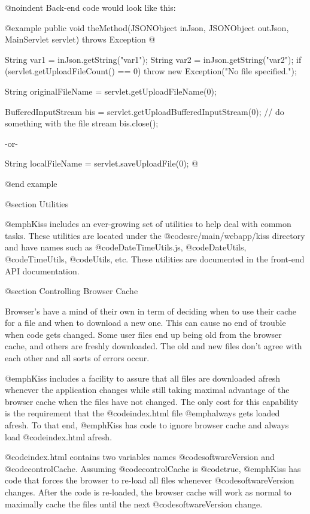 @noindent
Back-end code would look like this:

@example
public void theMethod(JSONObject inJson, JSONObject outJson, MainServlet servlet) throws Exception @{
    String var1 = inJson.getString("var1");
    String var2 = inJson.getString("var2");
    if (servlet.getUploadFileCount() == 0)
        throw new Exception("No file specified.");
        
    String originalFileName = servlet.getUploadFileName(0);
    
    
    BufferedInputStream bis = servlet.getUploadBufferedInputStream(0);
    // do something with the file stream
    bis.close();
    
         -or-
         
    String localFileName = servlet.saveUploadFile(0);
@}
@end example




@section Utilities

@emph{Kiss} includes an ever-growing set of utilities to help deal with common tasks.
These utilities are located under the @code{src/main/webapp/kiss} directory and have names such as
@code{DateTimeUtils.js}, @code{DateUtils}, @code{TimeUtils}, @code{Utils}, etc.  These utilities
are documented in the front-end API documentation.

@section Controlling Browser Cache

Browser's have a mind of their own in term of deciding when to use
their cache for a file and when to download a new one.  This can cause
no end of trouble when code gets changed.  Some user files end up
being old from the browser cache, and others are freshly downloaded.
The old and new files don't agree with each other and all sorts of
errors occur.

@emph{Kiss} includes a facility to assure that all files are
downloaded afresh whenever the application changes while still taking
maximal advantage of the browser cache when the files have not
changed.  The only cost for this capability is the requirement
that the @code{index.html} file @emph{always} gets loaded afresh.
To that end, @emph{Kiss} has code to ignore browser cache and always load
@code{index.html} afresh.

@code{index.html} contains two variables names @code{softwareVersion} and @code{controlCache}.
Assuming @code{controlCache} is @code{true}, @emph{Kiss} has code that forces the browser
to re-load all files whenever @code{softwareVersion} changes.  After the code is re-loaded,
the browser cache will work as normal to maximally cache the files until the next
@code{softwareVersion} change.

